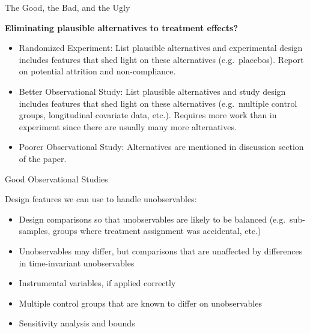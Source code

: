 \documentclass{beamer}
\numberwithin{equation}{section}
\begin{document}
\begin{frame}{The Good, the Bad, and the Ugly}

\textbf{Eliminating plausible alternatives to treatment effects?}

\begin{itemize}
\itemsep1pt\parskip0pt
\item
  \alert{Randomized Experiment}: List plausible alternatives and
  experimental design includes features that shed light on these
  alternatives (e.g.~placebos). Report on potential attrition and
  non-compliance. \medskip
\item
  \alert{Better Observational Study}: List plausible alternatives and
  study design includes features that shed light on these alternatives
  (e.g.~multiple control groups, longitudinal covariate data, etc.).
  Requires more work than in experiment since there are usually many
  more alternatives. \medskip
\item
  \alert{Poorer Observational Study}: Alternatives are mentioned in
  discussion section of the paper.
\end{itemize}

\end{frame}

\begin{frame}{Good Observational Studies}

\alert{Design features} we can use to handle unobservables:

\begin{itemize}
\itemsep1pt\parskip0pt
\item
  Design comparisons so that unobservables are likely to be balanced
  (e.g.~sub-samples, groups where treatment assignment was accidental,
  etc.) \medskip
\item
  Unobservables may differ, but comparisons that are unaffected by
  differences in time-invariant unobservables \medskip
\item
  Instrumental variables, if applied correctly \medskip
\item
  Multiple control groups that are known to differ on unobservables
  \medskip
\item
  Sensitivity analysis and bounds \medskip
\end{itemize}

\end{frame}
\end{document}
